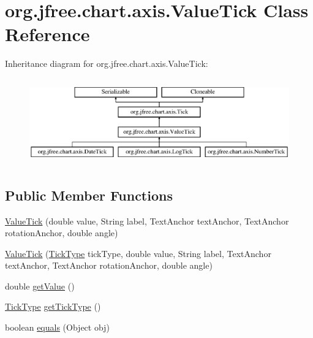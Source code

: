 \hypertarget{classorg_1_1jfree_1_1chart_1_1axis_1_1_value_tick}{}\section{org.\+jfree.\+chart.\+axis.\+Value\+Tick Class Reference}
\label{classorg_1_1jfree_1_1chart_1_1axis_1_1_value_tick}
Inheritance diagram for org.\+jfree.\+chart.\+axis.\+Value\+Tick\+:\begin{figure}[H]
\begin{center}
\leavevmode
\includegraphics[height=3.752094cm]{classorg_1_1jfree_1_1chart_1_1axis_1_1_value_tick}
\end{center}
\end{figure}
\subsection*{Public Member Functions}
\begin{DoxyCompactItemize}
\item 
\mbox{\hyperlink{classorg_1_1jfree_1_1chart_1_1axis_1_1_value_tick_afc0b0a46e762e5215927fdd692a638b1}{Value\+Tick}} (double value, String label, Text\+Anchor text\+Anchor, Text\+Anchor rotation\+Anchor, double angle)
\item 
\mbox{\hyperlink{classorg_1_1jfree_1_1chart_1_1axis_1_1_value_tick_a4ada4957b43460291688daa93a6f43fc}{Value\+Tick}} (\mbox{\hyperlink{classorg_1_1jfree_1_1chart_1_1axis_1_1_tick_type}{Tick\+Type}} tick\+Type, double value, String label, Text\+Anchor text\+Anchor, Text\+Anchor rotation\+Anchor, double angle)
\item 
double \mbox{\hyperlink{classorg_1_1jfree_1_1chart_1_1axis_1_1_value_tick_a4577d74617c0995204b5e675b8e60b08}{get\+Value}} ()
\item 
\mbox{\hyperlink{classorg_1_1jfree_1_1chart_1_1axis_1_1_tick_type}{Tick\+Type}} \mbox{\hyperlink{classorg_1_1jfree_1_1chart_1_1axis_1_1_value_tick_aaae3b0f10e6645db5df13585cbb915eb}{get\+Tick\+Type}} ()
\item 
boolean \mbox{\hyperlink{classorg_1_1jfree_1_1chart_1_1axis_1_1_value_tick_ad222c60d5dd6df5e68298d4672f06323}{equals}} (Object obj)
\end{DoxyCompactItemize}


